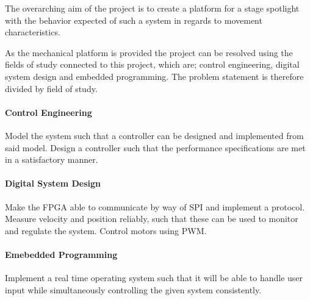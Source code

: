 \documentclass[../../main]{subfiles}
\begin{document}
The overarching aim of the project is to create a platform for a stage spotlight with the behavior expected of such a system in regards to movement characteristics.

As the mechanical platform is provided the project can be resolved using the fields of study connected to this project, which are; control engineering, digital system design and embedded programming.
The problem statement is therefore divided by field of study.



\paragraph{Control Engineering}%
\label{par:control_engineering}
Model the system such that a controller can be designed and implemented from said model.
Design a controller such that the performance specifications are met in a satisfactory manner.

\paragraph{Digital System Design}%
\label{par:digital_system_design}
Make the FPGA able to communicate by way of SPI and implement a protocol.
Measure velocity and position reliably, such that these can be used to monitor and regulate the
system.
Control motors using PWM.

\paragraph{Emebedded Programming}%
\label{par:emebedded_programming}
Implement a real time operating system such that it will be able to handle user input while simultaneously controlling the given system consistently.
\\
\end{document}
